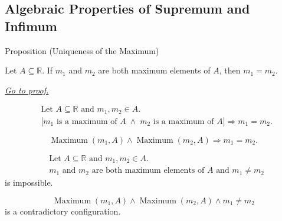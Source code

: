 \subsection*{Algebraic Properties of Supremum and Infimum}

\begin{propositionbox}{Proposition (Uniqueness of the Maximum)}
\begin{proposition}
\label{prop:uniqueness-of-the-maximum}
Let $A\subseteq\mathbb{R}$. If $m_1$ and $m_2$ are both maximum elements of $A$, then $m_1=m_2$.

\smallskip
\noindent
\hyperref[prf:uniqueness-of-the-maximum]{\textit{Go to proof.}}
\end{proposition}
\end{propositionbox}

\begin{remark*}
\[
\begin{aligned}
&\text{Let }A\subseteq\mathbb{R}\text{ and }m_1,m_2\in A.\\
&\bigl[m_1\text{ is a maximum of }A
\;\land\;
m_2\text{ is a maximum of }A\bigr]
\Longrightarrow
m_1=m_2.
\end{aligned}
\]
\end{remark*}

\begin{remark*}
\[
\operatorname{Maximum}(m_1,A)\land \operatorname{Maximum}(m_2,A)
\Longrightarrow
m_1=m_2.
\]
\end{remark*}

\begin{remark*}
\[
\begin{aligned}
&\text{Let }A\subseteq\mathbb{R}\text{ and }m_1,m_2\in A.\\
&m_1\text{ and }m_2\text{ are both maximum elements of }A
\text{ and }m_1\ne m_2
\end{aligned}
\]
is impossible.
\end{remark*}

\begin{remark*}
\[
\operatorname{Maximum}(m_1,A)\land \operatorname{Maximum}(m_2,A)\land m_1\ne m_2
\]
is a contradictory configuration.
\end{remark*}

